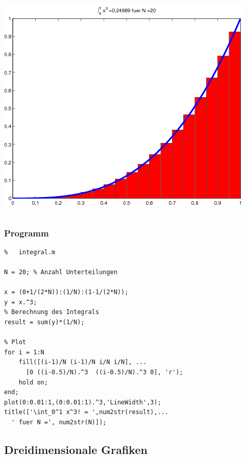 \begin{frame}[fragile]
\begin{columns}[t]
\includegraphics[width=\textwidth]{./figures/integral_N=20}
\end{columns}
\end{frame}
% 
% 
\begin{frame}[fragile]\frametitle{Programm}
\begin{lstlisting}
%   integral.m

N = 20; % Anzahl Unterteilungen

x = (0+1/(2*N)):(1/N):(1-1/(2*N));
y = x.^3;
% Berechnung des Integrals
result = sum(y)*(1/N);

% Plot
for i = 1:N
    fill([(i-1)/N (i-1)/N i/N i/N], ...
      [0 ((i-0.5)/N).^3  ((i-0.5)/N).^3 0], 'r');
    hold on;
end;
plot(0:0.01:1,(0:0.01:1).^3,'LineWidth',3);
title(['\int_0^1 x^3! = ',num2str(result),...
  ' fuer N =', num2str(N)]); 
\end{lstlisting}
\end{frame}

\subsection{Dreidimensionale Grafiken}

